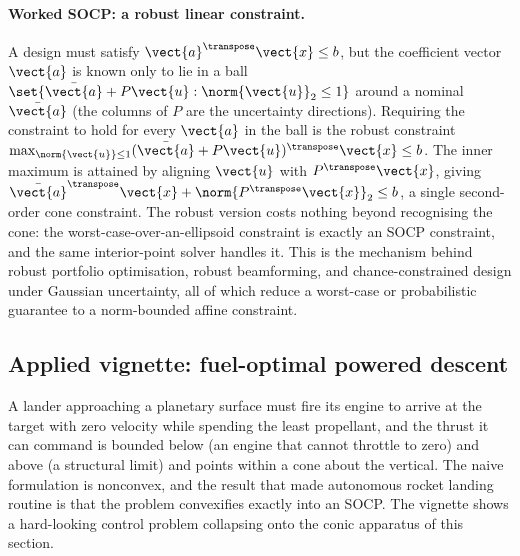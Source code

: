 \paragraph{Worked SOCP: a robust linear constraint.}
A design must satisfy $\vect{a}^{\transpose} \vect{x} \leq b$, but the
coefficient vector $\vect{a}$ is known only to lie in a ball
$\set{\bar{\vect{a}} + P \vect{u} : \norm{\vect{u}}_{2} \leq 1}$ around
a nominal $\bar{\vect{a}}$ (the columns of $P$ are the uncertainty
directions). Requiring the constraint to hold for every $\vect{a}$ in
the ball is the robust constraint $\max_{\norm{\vect{u}} \leq 1}
(\bar{\vect{a}} + P \vect{u})^{\transpose} \vect{x} \leq b$. The inner
maximum is attained by aligning $\vect{u}$ with $P^{\transpose}
\vect{x}$, giving $\bar{\vect{a}}^{\transpose} \vect{x} +
\norm{P^{\transpose} \vect{x}}_{2} \leq b$, a single second-order cone
constraint. The robust version costs nothing beyond recognising the
cone: the worst-case-over-an-ellipsoid constraint is exactly an SOCP
constraint, and the same interior-point solver handles it. This is the
mechanism behind robust portfolio optimisation, robust beamforming, and
chance-constrained design under Gaussian uncertainty, all of which
reduce a worst-case or probabilistic guarantee to a norm-bounded affine
constraint.

\subsection{Applied vignette: fuel-optimal powered descent}

A lander approaching a planetary surface must fire its engine to arrive
at the target with zero velocity while spending the least propellant,
and the thrust it can command is bounded below (an engine that cannot
throttle to zero) and above (a structural limit) and points within a
cone about the vertical. The naive formulation is nonconvex, and the
result that made autonomous rocket landing routine is that the problem
convexifies exactly into an SOCP. The vignette shows a hard-looking
control problem collapsing onto the conic apparatus of this section.

